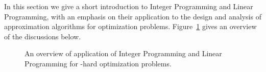 \documentclass[oneside,final]{ucr}
\def\dsp{\def\baselinestretch{2.0}\large\normalsize}
\def\ssp{\def\baselinestretch{1.0}\large\normalsize}
\begin{document}
In this section we give a short introduction to Integer
Programming and Linear Programming, with an emphasis on
their application to the design and analysis of
approximation algorithms for optimization
problems. Figure~\ref{fig:npo_ilp} gives an overview of the
discussions below.
\ssp
\begin{figure}[ht]
  \centering
  \caption{An overview of application of Integer Programming and Linear Programming for \NP-hard optimization problems.}
  \label{fig:npo_ilp}
\end{figure}
\dsp
\end{document}
